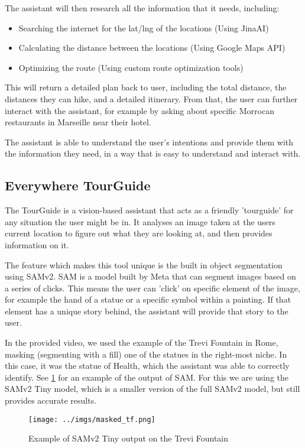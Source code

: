 \documentclass{article}
\begin{document}
The assistant will then research all the information that it needs, including:

\begin{itemize}
\item Searching the internet for the lat/lng of the locations (Using JinaAI)
\item Calculating the distance between the locations (Using Google Maps API)
\item Optimizing the route (Using custom route optimization tools)
\end{itemize}

This will return a detailed plan back to user, including the total distance, the distances they can hike, and a detailed itinerary. From that, the user can further interact with the assistant, for example by asking about specific Morrocan restaurants in Marseille near their hotel.

The assistant is able to understand the user's intentions and provide them with the information they need, in a way that is easy to understand and interact with.

\subsection{Everywhere TourGuide}

The TourGuide is a vision-based assistant that acts as a friendly 'tourguide' for any situation the user might be in. It analyses an image taken at the users current location to figure out what they are looking at, and then provides information on it.

The feature which makes this tool unique is the built in object segmentation using SAMv2. SAM is a model built by Meta that can segment images based on a series of clicks. This means the user can 'click' on specific element of the image, for example the hand of a statue or a specific symbol within a painting. If that element has a unique story behind, the assistant will provide that story to the user.

In the provided video, we used the example of the Trevi Fountain in Rome, masking (segmenting with a fill) one of the statues in the right-most niche. In this case, it was the statue of Health, which the assistant was able to correctly identify. See \ref{fig:mask} for an example of the output of SAM. For this we are using the SAMv2 Tiny model, which is a smaller version of the full SAMv2 model, but still provides accurate results.

\begin{figure}
    \centering
    \texttt{[image: ../imgs/masked\_tf.png]}
    \caption{Example of SAMv2 Tiny output on the Trevi Fountain}
    \label{fig:mask}
\end{figure}
\end{document}
